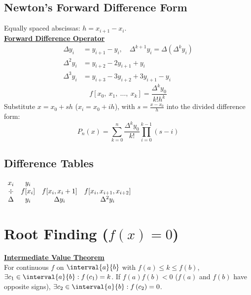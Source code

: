 \documentclass{article}
\begin{document}
\begin{multicols}{3}
    \subsection{Newton's Forward Difference Form}
    Equally spaced abscissas: \(h =  x_{i + 1} - x_i\). \\
    \underline{\textbf{Forward Difference Operator}}
    \begin{align*}
        \Delta y_i   & = y_{i + 1} - y_i, \quad \Delta^{k + 1} y_i = \Delta \left( \Delta^k y_i \right) \\
        \Delta^2 y_i & = y_{i + 2} - 2y_{i + 1} + y_i                                                   \\
        \Delta^3 y_i & = y_{i + 3} - 3y_{i + 2} + 3y_{i + 1} - y_i
    \end{align*}
    \begin{equation*}
        f\left[ x_0,\: x_1,\: \dots,\: x_k \right] = \frac{\Delta^k y_0}{k! h^k}
    \end{equation*}
    Substitute \(x = x_0 + s h\) (\(x_i = x_0 + i h\)), with \(s = \frac{x - x_0}{h}\) into the divided difference form:
    \begin{equation*}
        P_n\left( x \right) = \sum_{k = 0}^n \frac{\Delta^k y_0}{k!} \prod_{i = 0}^{k - 1} \left( s - i \right)
    \end{equation*}
    \subsection{Difference Tables}
    \(\begin{array}{c c c c}
        x_i    & y_i      &  \\
        \div   & f[x_i]   & f[x_i, x_i+1] & f[x_i, x_{i+1}, x_{i+2}] \\
        \Delta & y_i      & \Delta y_i    & \Delta^2 y_i
    \end{array}\)
    \section{Root Finding (\texorpdfstring{\(f\left( x \right) = 0\)}{f(x) = 0})}
    \underline{\textbf{Intermediate Value Theorem}} \\
    For continuous \(f\) on \(\interval{a}{b}\) with \(f\left( a \right) \leq k \leq f\left( b \right)\),
    \(\exists c_1 \in \interval{a}{b} : f\left( c_1 \right) = k\).
    If \(f\left( a \right) f\left( b \right) < 0\) (\(f\left( a \right)\) and \(f\left( b \right)\) have opposite signs),
    \(\exists c_2 \in \interval{a}{b} : f\left( c_2 \right) = 0\).

\end{multicols}
\end{document}
